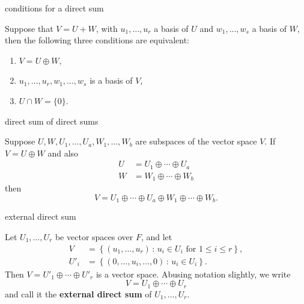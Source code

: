 \documentclass[avery5371,grid]{flashcards}
\renewcommand{\le}{\leqslant}
\newcommand{\set}[2]{\ensuremath{\left\{ #1 \, : \, #2 \right\}}}
\newcommand{\defn}[1]{\textbf{#1}}
\begin{document}
\begin{flashcard}[Theorem]{conditions for a direct sum}

  Suppose that $V = U + W$, with $u_1, \ldots, u_r$ a basis of $U$ and
  $w_1, \ldots, w_s$ a basis of $W$, then the following three
  conditions are equivalent:
  \begin{enumerate}
  \item $V = U \oplus W$,
  \item $u_1, \ldots, u_r, w_1, \ldots, w_s$ is a basis of $V$,
  \item $U \cap W = \{ 0 \}$.
  \end{enumerate}

\end{flashcard}

\begin{flashcard}[Theorem]{direct sum of direct sums}

  Suppose $U, W, U_1, \ldots, U_a, W_1, \ldots, W_b$ are subspaces of
  the vector space $V$. If $V = U \oplus W$ and also
  \begin{align*}
    U &= U_1 \oplus \cdots \oplus U_a \\
    W &= W_1 \oplus \cdots \oplus W_b
  \end{align*}
  then
  \[
    V = U_1 \oplus \cdots \oplus U_a\oplus W_1 \oplus \cdots \oplus W_b.
  \]

\end{flashcard}

\begin{flashcard}[Definition]{external direct sum}

  Let $U_1, \ldots, U_r$ be vector spaces over $F$, and let
  \begin{align*}
    V &= \set{(u_1, \ldots, u_r)}{u_i \in U_i \text{ for } 1 \le i \le r},\\
    U'_i &= \set{(0, \ldots, u_i, \ldots, 0)}{u_i \in U_i}.
  \end{align*}
  Then $V = U'_1 \oplus \cdots \oplus U'_r$ is a vector space. Abusing
  notation slightly, we write
  \[
    V = U_1 \oplus \cdots \oplus U_r
  \]
  and call it the \defn{external direct sum} of $U_1, \ldots, U_r$.
\end{flashcard}
\end{document}
